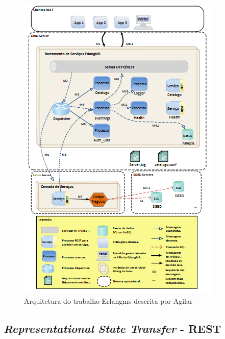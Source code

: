 \begin{figure}[H]
	\begin{center}
	\includegraphics[scale = 1.30]{img/Arquitetura_ErlangMS.png}
		\caption{Arquitetura do trabalho Erlangms descrita por Agilar \cite{Agilar}}
		\label{fun:fig:Erlangms}
	\end{center}
\end{figure}


\subsection{\textit{Representational State Transfer} - REST}

